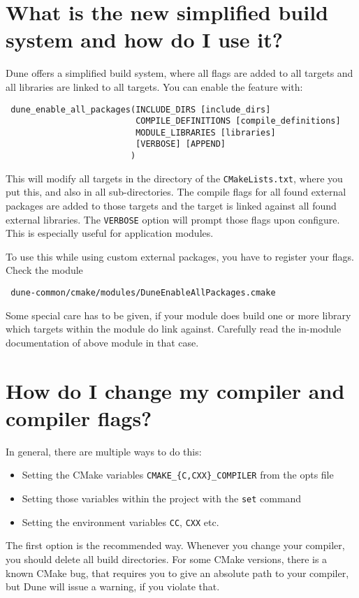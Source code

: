 \documentclass[a4paper,10pt,DIV9,headings=small]{scrartcl}
\newcommand{\cmakelists}{\lstinline!CMakeLists.txt!\xspace}
\begin{document}
\section{What is the new simplified build system and how do I use it?}
\label{simplified}
Dune offers a simplified build system, where all flags are added to all targets and all libraries are linked to all targets. You can enable the feature with:
\begin{lstlisting}
 dune_enable_all_packages(INCLUDE_DIRS [include_dirs]
                          COMPILE_DEFINITIONS [compile_definitions]
                          MODULE_LIBRARIES [libraries]
                          [VERBOSE] [APPEND]
                         )
\end{lstlisting}
This will modify all targets in the directory of the \cmakelists, where you put this, and also in all
sub-directories. The compile flags for all found external packages are added to those targets and the target is
linked against all found external libraries. The \lstinline!VERBOSE! option will prompt those flags upon
configure. This is especially useful for application modules.

To use this while using custom external packages, you have to register your flags. Check the module
\begin{lstlisting}
 dune-common/cmake/modules/DuneEnableAllPackages.cmake
\end{lstlisting}

Some special care has to be given, if your module does build one or more library which targets within the module do link against. Carefully read the in-module documentation of above module in that case.

\section{How do I change my compiler and compiler flags?}
\label{compiler}
In general, there are multiple ways to do this:
\begin{itemize}
 \item Setting the CMake variables \verb!CMAKE_{C,CXX}_COMPILER! from the opts file
 \item Setting those variables within the project with the \verb!set! command
 \item Setting the environment variables \verb!CC!, \verb!CXX! etc.
\end{itemize}

The first option is the recommended way. Whenever you change your compiler, you should delete all build
directories. For some CMake versions, there is a known CMake bug, that requires you to give an absolute path
to your compiler, but Dune will issue a warning, if you violate that.
\end{document}
